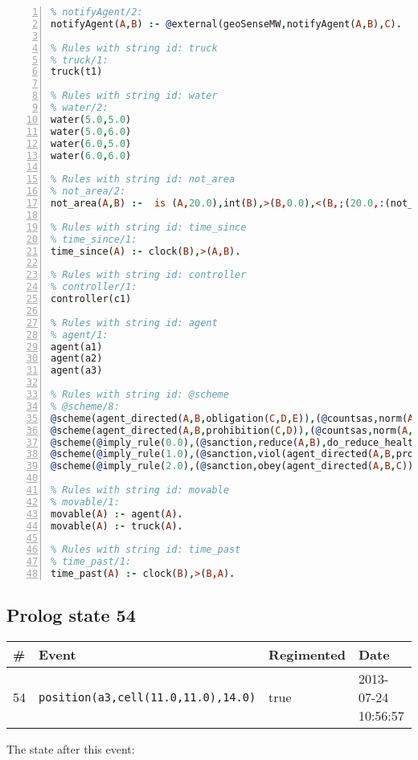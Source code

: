 \documentclass[11pt]{article}\usepackage[utf8]{inputenc}\usepackage{geometry}
\begin{document}
\begin{lstlisting}[language=Prolog, numbers=left]
% Rules with string id: notifyAgent
% notifyAgent/2:
notifyAgent(A,B) :- @external(geoSenseMW,notifyAgent(A,B),C).

% Rules with string id: truck
% truck/1:
truck(t1)

% Rules with string id: water
% water/2:
water(5.0,5.0)
water(5.0,6.0)
water(6.0,5.0)
water(6.0,6.0)

% Rules with string id: not_area
% not_area/2:
not_area(A,B) :-  is (A,20.0),int(B),>(B,0.0),<(B,;(20.0,:(not_area(A,B), is (-(B),20.0)))),int(A),>(A,0.0),<(A,;(20.0,:(area(A,B),-(int(A))))),int(B),>(A,0.0),>(B,0.0),<(A,21.0),<(B,21.0).

% Rules with string id: time_since
% time_since/1:
time_since(A) :- clock(B),>(A,B).

% Rules with string id: controller
% controller/1:
controller(c1)

% Rules with string id: agent
% agent/1:
agent(a1)
agent(a2)
agent(a3)

% Rules with string id: @scheme
% @scheme/8:
@scheme(agent_directed(A,B,obligation(C,D,E)),(@countsas,norm(A,B,F,obligation(C,D,E)),F),false,(listTrue(C)),(time_past(D)),false,[plus(viol(agent_directed(A,B,obligation(C,D,E))))|[]],[plus(obey(agent_directed(A,B,obligation(C,D,E))))|[]])
@scheme(agent_directed(A,B,prohibition(C,D)),(@countsas,norm(A,B,E,prohibition(C,D)),E),(listTrue(C)),false,(false),false,[plus(viol(agent_directed(A,B,prohibition(C,D))))|[]],[plus(obey(agent_directed(A,B,prohibition(C,D))))|[]])
@scheme(@imply_rule(0.0),(@sanction,reduce(A,B),do_reduce_health(A,B),notifyAgent(A,changed(status))),true,false,false,false,[min(reduce(A,B))|[]],[])
@scheme(@imply_rule(1.0),(@sanction,viol(agent_directed(A,B,prohibition(C,D))),do_sanction(D)),true,false,false,false,[min(viol(agent_directed(A,B,prohibition(C,D))))|[]],[])
@scheme(@imply_rule(2.0),(@sanction,obey(agent_directed(A,B,C))),true,false,false,false,[min(obey(agent_directed(A,B,C)))|[]],[])

% Rules with string id: movable
% movable/1:
movable(A) :- agent(A).
movable(A) :- truck(A).

% Rules with string id: time_past
% time_past/1:
time_past(A) :- clock(B),>(B,A).

\end{lstlisting}
\clearpage 
\subsection{Prolog state 54}
\begin{table}[ht]
\centering 
\begin{tabular}{l l l l} 
\textbf{\#} & \textbf{Event} & \textbf{Regimented} & \textbf{Date} \\ [0.5ex] 
\hline
54&\texttt{position(a3,cell(11.0,11.0),14.0)}&true&2013-07-24 10:56:57\\ [1ex] \hline\end{tabular}
\end{table}
The state after this event:
\end{document}
